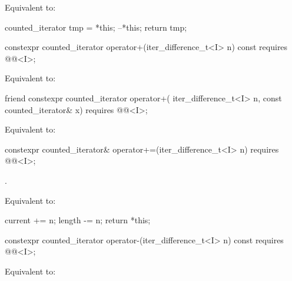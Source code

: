\begin{itemdescr}
\pnum
\effects
Equivalent to:
\begin{codeblock}
counted_iterator tmp = *this;
--*this;
return tmp;
\end{codeblock}
\end{itemdescr}

%
\begin{itemdecl}
  constexpr counted_iterator operator+(iter_difference_t<I> n) const
    requires @@<I>;
\end{itemdecl}

\begin{itemdescr}
\pnum
\effects
Equivalent to: 
\end{itemdescr}

%
\begin{itemdecl}
friend constexpr counted_iterator operator+(
  iter_difference_t<I> n, const counted_iterator& x)
    requires @@<I>;
\end{itemdecl}

\begin{itemdescr}
\pnum
\effects
Equivalent to: 
\end{itemdescr}

%
\begin{itemdecl}
  constexpr counted_iterator& operator+=(iter_difference_t<I> n)
    requires @@<I>;
\end{itemdecl}

\begin{itemdescr}
\pnum
\expects
{}.

\pnum
\effects
Equivalent to:
\begin{codeblock}
current += n;
length -= n;
return *this;
\end{codeblock}
\end{itemdescr}

%
\begin{itemdecl}
  constexpr counted_iterator operator-(iter_difference_t<I> n) const
    requires @@<I>;
\end{itemdecl}

\begin{itemdescr}
\pnum
\effects
Equivalent to: 
\end{itemdescr}

